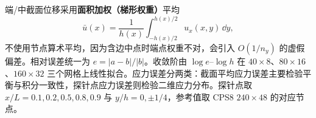 端/中截面位移采用\textbf{面积加权（梯形权重）}平均
\begin{equation}
  \bar u(x)=\frac1{h(x)}\int_{-h(x)/2}^{h(x)/2}u_x(x,y)\,\dd y,
  \label{eq:ubar}
\end{equation}
不使用节点算术平均，因为含边中点时端点权重不对，会引入 $O(1/n_y)$ 的虚假偏差。相对误差统一为 $e=|a-b|/|b|$。收敛阶由 $\log e$--$\log h$ 在 $40\times8$、$80\times16$、$160\times32$ 三个网格上线性拟合。应力误差分两类：截面平均应力误差主要检验平衡与积分一致性，探针点应力误差则检验二维应力分布。探针点取 $x/L=0.1,0.2,0.5,0.8,0.9$ 与 $y/h=0,\pm1/4$，参考值取 CPS8 $240\times48$ 的对应节点。